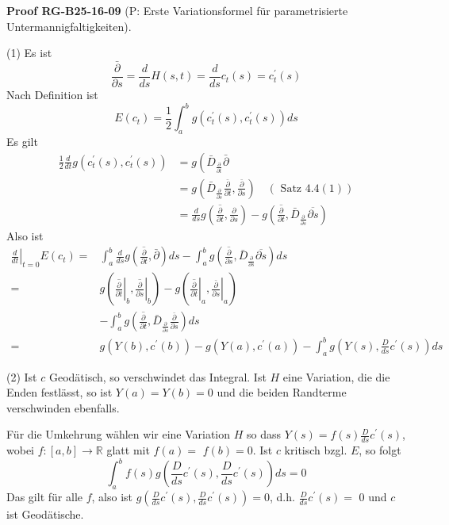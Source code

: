 \documentclass[10pt, letterpaper]{article}
\newcommand{\CustomHeading}[3]{%
  \par\medskip\noindent%
  \textbf{#1 #2} \textnormal{(#3)}.\enskip%
}
\newenvironment{PROOF}[2]{\begin{unitbox}\CustomHeading{Proof}{#1}{#2}}{\end{unitbox}}
\begin{document}
\begin{PROOF}{RG-B25-16-09}{P: Erste Variationsformel für parametrisierte Untermannigfaltigkeiten}
(1) Es ist
$$
\frac{\bar{\partial}}{\partial s}=\frac{d}{d s} H(s, t)=\frac{d}{d s} c_{t}(s)=c_{t}^{\prime}(s)
$$
Nach Definition ist
$$
E\left(c_{t}\right)=\frac{1}{2} \int_{a}^{b} g\left(c_{t}^{\prime}(s), c_{t}^{\prime}(s)\right) d s
$$
Es gilt
\begin{align*}
\frac{1}{2} \frac{d}{d t} g\left(c_{t}^{\prime}(s), c_{t}^{\prime}(s)\right) & =g\left(\bar{D}_{\frac{\partial}{\partial t}} \bar{\partial}\right.\\
& =g\left(\bar{D}_{\frac{\partial}{\partial s}} \frac{\bar{\partial}}{\partial t}, \frac{\bar{\partial}}{\partial s}\right) \quad(\text { Satz } 4.4(1))  \\
& =\frac{d}{d s} g\left(\overline{\frac{\partial}{\partial t}}, \frac{\partial}{\partial s}\right)-g\left(\overline{\frac{\partial}{\partial t}}, \bar{D}_{\frac{\partial}{\partial s}} \overline{\partial s}\right) 
\end{align*}
Also ist
$$
\begin{aligned}
\left.\frac{d}{d t}\right|_{t=0} E\left(c_{t}\right)= & \int_{a}^{b} \frac{d}{d s} g\left(\overline{\frac{\partial}{\partial t}}, \bar{\partial}\right) d s-\int_{a}^{b} g\left(\overline{\frac{\partial}{\partial s}}, \bar{D}_{\frac{\partial}{\partial s}} \overline{\partial s}\right) d s \\
= & g\left(\left.\overline{\frac{\partial}{\partial t}}\right|_{b},\left.\overline{\frac{\partial}{\partial s}}\right|_{b}\right)-g\left(\left.\overline{\frac{\partial}{\partial t}}\right|_{a},\left.\frac{\bar{\partial}}{\partial s}\right|_{a}\right) \\
& -\int_{a}^{b} g\left(\overline{\frac{\partial}{\partial t}}, \bar{D}_{\frac{\partial}{\partial s}} \frac{\bar{\partial}}{\partial s}\right) d s \\
= & g\left(Y(b), c^{\prime}(b)\right)-g\left(Y(a), c^{\prime}(a)\right)-\int_{a}^{b} g\left(Y(s), \frac{D}{d s} c^{\prime}(s)\right) d s
\end{aligned}
$$

(2) Ist $c$ Geodätisch, so verschwindet das Integral. Ist $H$ eine Variation, die die Enden festlässt, so ist $Y(a)=Y(b)=0$ und die beiden Randterme verschwinden ebenfalls.

Für die Umkehrung wählen wir eine Variation $H$ so dass $Y(s)=f(s) \frac{D}{d s} c^{\prime}(s)$, wobei $f:[a, b] \rightarrow \mathbb{R}$ glatt mit $f(a)=$ $f(b)=0$. Ist $c$ kritisch bzgl. $E$, so folgt
$$
\int_{a}^{b} f(s) g\left(\frac{D}{d s} c^{\prime}(s), \frac{D}{d s} c^{\prime}(s)\right) d s=0
$$
Das gilt für alle $f$, also ist $g\left(\frac{D}{d s} c^{\prime}(s), \frac{D}{d s} c^{\prime}(s)\right)=0$, d.h. $\frac{D}{d s} c^{\prime}(s)=$ 0 und $c$ ist Geodätische.\\



\end{PROOF}
\end{document}
